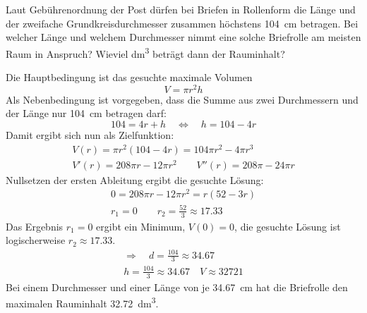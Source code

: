 \documentclass[auto-toc=false,babel=ngerman]{arbeitsblatt}
\begin{document}
\begin{question}
  Laut Gebührenordnung der Post dürfen bei Briefen in Rollenform die Länge und
  der zweifache Grundkreisdurchmesser zusammen höchstens
  \SI{104}{\centi\metre} betragen.  Bei welcher Länge und welchem Durchmesser
  nimmt eine solche Briefrolle am meisten Raum in Anspruch?  Wieviel
  \si{\deci\metre\cubed} beträgt dann der Rauminhalt?
\end{question}
\begin{solution}
  Die Hauptbedingung ist das gesuchte maximale Volumen
  \[ V = \pi r^2h \]
  Als Nebenbedingung ist vorgegeben, dass die Summe aus zwei Durchmessern und
  der Länge nur \SI{104}{\centi\metre} betragen darf:
  \[ 104 = 4r+h \quad\Leftrightarrow\quad h = 104-4r \]
  Damit ergibt sich nun als Zielfunktion:
  \begin{gather*}
    V(r)   = \pi r^2(104-4r) = 104\pi r^2 -4\pi r^3 \\
    V'(r)  = 208\pi r - 12\pi r^2 \qquad
    V''(r) = 208\pi - 24\pi r
  \end{gather*}
  Nullsetzen der ersten Ableitung ergibt die gesuchte Lösung:
  \begin{gather*}
    0 = 208\pi r - 12\pi r^2 = r(52-3r) \\
    r_1 = 0 \qquad r_2 = \frac{52}{3} \approx \num{17.33}
  \end{gather*}
  Das Ergebnis $r_1=0$ ergibt ein Minimum, $V(0)=0$, die gesuchte Lösung ist
  logischerweise $r_2 \approx \num{17.33}$.
  \begin{gather*}
    \Rightarrow\quad d = \frac{104}{3} \approx \num{34.67} \\
    h = \frac{104}{3} \approx \num{34.67} \quad
    V \approx 32721
  \end{gather*}
  Bei einem Durchmesser und einer Länge von je \SI{34.67}{\centi\metre} hat
  die Briefrolle den maximalen Rauminhalt \SI{32.72}{\deci\metre\cubed}.
\end{solution}
\end{document}
